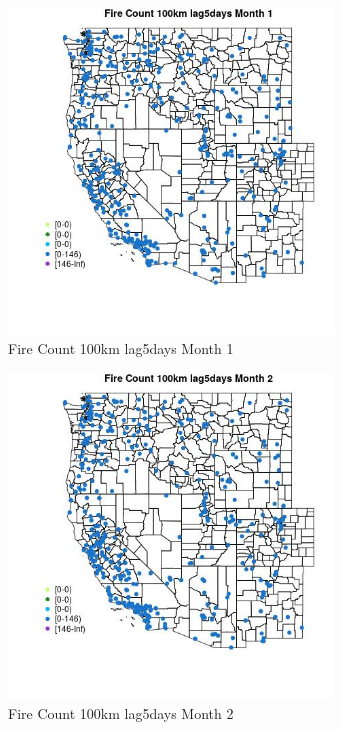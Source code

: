 \begin{figure} 
\centering  
\includegraphics[width=0.77\textwidth]{Code_Outputs/Report_ML_input_PM25_Step4_part_e_de_duplicated_aves_compiled_2019-05-18wNAs_MapObsMo1Fire_Count_100km_lag5days.jpg} 
\caption{\label{fig:Report_ML_input_PM25_Step4_part_e_de_duplicated_aves_compiled_2019-05-18wNAsMapObsMo1Fire_Count_100km_lag5days}Fire Count 100km lag5days Month 1} 
\end{figure} 
 

\begin{figure} 
\centering  
\includegraphics[width=0.77\textwidth]{Code_Outputs/Report_ML_input_PM25_Step4_part_e_de_duplicated_aves_compiled_2019-05-18wNAs_MapObsMo2Fire_Count_100km_lag5days.jpg} 
\caption{\label{fig:Report_ML_input_PM25_Step4_part_e_de_duplicated_aves_compiled_2019-05-18wNAsMapObsMo2Fire_Count_100km_lag5days}Fire Count 100km lag5days Month 2} 
\end{figure} 
 

